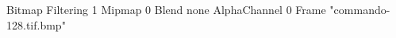 {Bitmap
	{Filtering 1}
	{Mipmap 0}
	{Blend none}
	{AlphaChannel 0}
	{Frame "commando-128.tif.bmp"}
}
